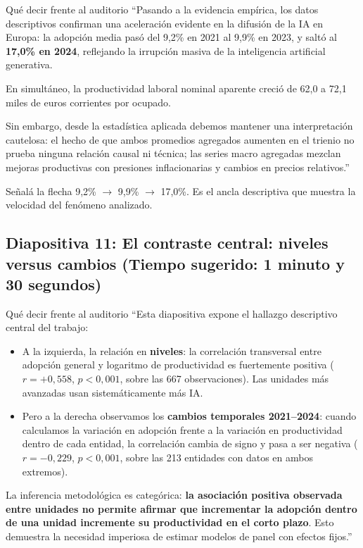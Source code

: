 \documentclass[11pt,a4paper]{article}
\begin{document}
\begin{speechbox}{Qué decir frente al auditorio}
``Pasando a la evidencia empírica, los datos descriptivos confirman una aceleración evidente en la difusión de la IA en Europa: la adopción media pasó del 9,2\% en 2021 al 9,9\% en 2023, y saltó al \textbf{17,0\% en 2024}, reflejando la irrupción masiva de la inteligencia artificial generativa.

En simultáneo, la productividad laboral nominal aparente creció de 62,0 a 72,1 miles de euros corrientes por ocupado.

Sin embargo, desde la estadística aplicada debemos mantener una interpretación cautelosa: el hecho de que ambos promedios agregados aumenten en el trienio no prueba ninguna relación causal ni técnica; las series macro agregadas mezclan mejoras productivas con presiones inflacionarias y cambios en precios relativos.''
\end{speechbox}

\begin{tipbox}
Señalá la flecha 9,2\% $\rightarrow$ 9,9\% $\rightarrow$ 17,0\%. Es el ancla descriptiva que muestra la velocidad del fenómeno analizado.
\end{tipbox}

\subsection*{Diapositiva 11: El contraste central: niveles versus cambios (Tiempo sugerido: 1 minuto y 30 segundos)}

\begin{speechbox}{Qué decir frente al auditorio}
``Esta diapositiva expone el hallazgo descriptivo central del trabajo:
\begin{itemize}[itemsep=0.2em]
  \item A la izquierda, la relación en \textbf{niveles}: la correlación transversal entre adopción general y logaritmo de productividad es fuertemente positiva ($r = +0{,}558$, $p < 0{,}001$, sobre las 667 observaciones). Las unidades más avanzadas usan sistemáticamente más IA.
  \item Pero a la derecha observamos los \textbf{cambios temporales 2021--2024}: cuando calculamos la variación en adopción frente a la variación en productividad dentro de cada entidad, la correlación cambia de signo y pasa a ser negativa ($r = -0{,}229$, $p < 0{,}001$, sobre las 213 entidades con datos en ambos extremos).
\end{itemize}

La inferencia metodológica es categórica: \textbf{la asociación positiva observada entre unidades no permite afirmar que incrementar la adopción dentro de una unidad incremente su productividad en el corto plazo}. Esto demuestra la necesidad imperiosa de estimar modelos de panel con efectos fijos.''
\end{speechbox}
\end{document}
